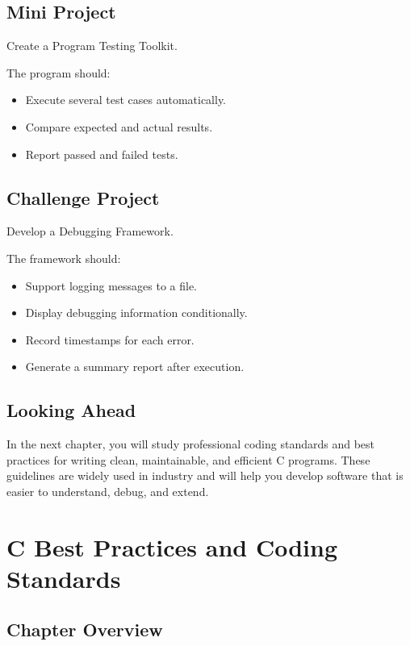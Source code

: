 \documentclass[12pt,openany]{book}
\begin{document}
\section{Mini Project}

Create a Program Testing Toolkit.

The program should:

\begin{itemize}
    \item Execute several test cases automatically.
    \item Compare expected and actual results.
    \item Report passed and failed tests.
\end{itemize}

\section{Challenge Project}

Develop a Debugging Framework.

The framework should:

\begin{itemize}
    \item Support logging messages to a file.
    \item Display debugging information conditionally.
    \item Record timestamps for each error.
    \item Generate a summary report after execution.
\end{itemize}

\section{Looking Ahead}

In the next chapter, you will study professional coding standards and best practices for writing clean, maintainable, and efficient C programs. These guidelines are widely used in industry and will help you develop software that is easier to understand, debug, and extend.
\chapter{C Best Practices and Coding Standards}

\section{Chapter Overview}
\end{document}
